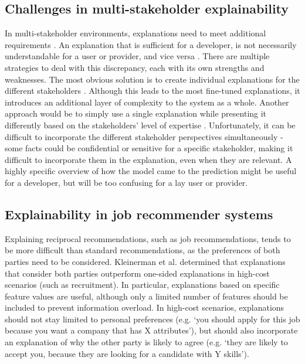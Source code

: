 \subsection{Challenges in multi-stakeholder explainability}
In multi-stakeholder environments, explanations need to meet additional requirements \cite{abdollahpouri2020multistakeholder}. An explanation that is sufficient for a developer, is not necessarily understandable for a user or provider, and vice versa \cite{szymanski2021visual}. There are multiple strategies to deal with this discrepancy, each with its own strengths and weaknesses. The most obvious solution is to create individual explanations for the different stakeholders \cite{yildirim2021bideepfm}. Although this leads to the most fine-tuned explanations, it introduces an additional layer of complexity to the system as a whole. Another approach would be to simply use a single explanation while presenting it differently based on the stakeholders' level of expertise \cite{abdollahpouri2020multistakeholder}. Unfortunately, it can be difficult to incorporate the different stakeholder perspectives simultaneously - some facts could be confidential or sensitive for a specific stakeholder, making it difficult to incorporate them in the explanation, even when they are relevant. A highly specific overview of how the model came to the prediction might be useful for a developer, but will be too confusing for a lay user or provider. 

\subsection{Explainability in job recommender systems}
Explaining reciprocal recommendations, such as job recommendations, tends to be more difficult than standard recommendations, as the preferences of both parties need to be considered. Kleinerman et al. \cite{kleinerman2018providing} determined that explanations that consider both parties outperform one-sided explanations in high-cost scenarios (such as recruitment). In particular, explanations based on specific feature values are useful, although only a limited number of features should be included to prevent information overload. In high-cost scenarios, explanations should not stay limited to personal preferences (e.g. `you should apply for this job because you want a company that has X attributes'), but should also incorporate an explanation of why the other party is likely to agree (e.g. `they are likely to accept you, because they are looking for a candidate with Y skills'). 

